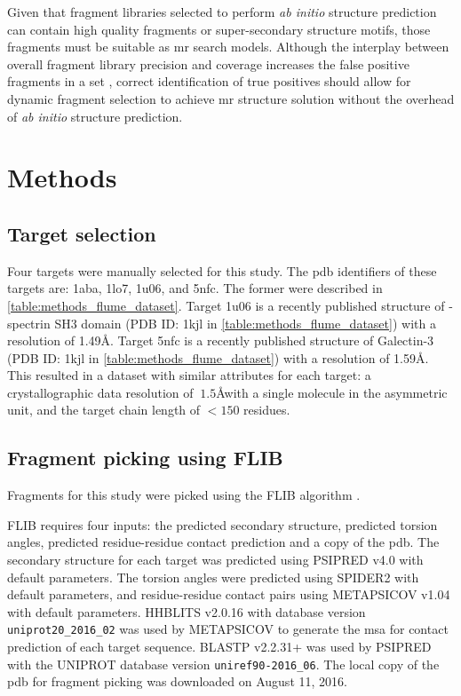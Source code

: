 Given that fragment libraries selected to perform \textit{ab initio} structure prediction can contain high quality fragments or super-secondary structure motifs, those fragments must be suitable as \gls{mr} search models. Although the interplay between overall fragment library precision and coverage increases the false positive fragments in a set \cite{Kalev2011-te}, correct identification of true positives should allow for dynamic fragment selection to achieve \gls{mr} structure solution without the overhead of \textit{ab initio} structure prediction.

\section{Methods}
\subsection{Target selection}
Four targets were manually selected for this study. The \gls{pdb} identifiers of these targets are: 1aba, 1lo7, 1u06, and 5nfc. The former were described in \cref{table:methods_flume_dataset}. Target 1u06 is a recently published structure of \textalpha-spectrin SH3 domain (PDB ID: 1kjl in \cref{table:methods_flume_dataset}) with a resolution of 1.49\AA. Target 5nfc is a recently published structure of Galectin-3 (PDB ID: 1kjl in \cref{table:methods_flume_dataset}) with a resolution of 1.59\AA. This resulted in a dataset with similar attributes for each target: a crystallographic data resolution of $~1.5$\AA with a single molecule in the asymmetric unit, and the target chain length of $<150$ residues.

\subsection{Fragment picking using FLIB}
Fragments for this study were picked using the FLIB algorithm \cite{De_Oliveira2015-ba}. 

FLIB requires four inputs: the predicted secondary structure, predicted torsion angles, predicted residue-residue contact prediction and a copy of the \gls{pdb}. The secondary structure for each target was predicted using PSIPRED v4.0 \cite{Jones1999-fi} with default parameters. The torsion angles were predicted using SPIDER2 \cite{Heffernan2015-wp} with default parameters, and residue-residue contact pairs using METAPSICOV v1.04 \cite{Jones2015-wp} with default parameters. HHBLITS v2.0.16 \cite{Remmert2011-ze} with database version \texttt{uniprot20\_2016\_02} was used by METAPSICOV to generate the \gls{msa} for contact prediction of each target sequence. BLASTP v2.2.31+ \cite{Altschul1990-nc,Camacho2009-ue} was used by PSIPRED with the UNIPROT database version \texttt{uniref90-2016\_06}. The local copy of the \gls{pdb} for fragment picking was downloaded on August 11, 2016.

